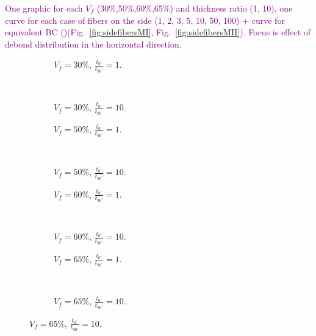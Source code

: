 \documentclass[review]{elsarticle}
\begin{document}
\textcolor{purple}{One graphic for each $V_{f}$ (30\%,50\%,60\%,65\%) and thickness ratio (1, 10), one curve for each case of fibers on the side (1, 2, 3, 5, 10, 50, 100) + curve for equivalent BC ()(Fig.~\ref{fig:sidefibersMI}, Fig.~\ref{fig:sidefibersMII}). Focus is effect of debond distribution in the horizontal direction.}\\

\begin{figure}[!h]
\centering
    \begin{subfigure}[b]{0.45\textwidth}
        \caption{$V_{f}=30\%$, $\frac{t_{0^{\circ}}}{t_{90^{\circ}}}=1$.}\label{subfig:sidefiber30MIthick1}
    \end{subfigure} ~
    \begin{subfigure}[b]{0.45\textwidth}
         \caption{$V_{f}=30\%$, $\frac{t_{0^{\circ}}}{t_{90^{\circ}}}=10$.}\label{subfig:sidefiber30MIthick10}
    \end{subfigure}

   \begin{subfigure}[b]{0.45\textwidth}
        \caption{$V_{f}=50\%$, $\frac{t_{0^{\circ}}}{t_{90^{\circ}}}=1$.}\label{subfig:sidefiber50MIthick1}
    \end{subfigure} ~
    \begin{subfigure}[b]{0.45\textwidth}
         \caption{$V_{f}=50\%$, $\frac{t_{0^{\circ}}}{t_{90^{\circ}}}=10$.}\label{subfig:sidefiber50MIthick10}
    \end{subfigure}

    \begin{subfigure}[b]{0.45\textwidth}
        \caption{$V_{f}=60\%$, $\frac{t_{0^{\circ}}}{t_{90^{\circ}}}=1$.}\label{subfig:sidefiber60MIthick1}
    \end{subfigure} ~
    \begin{subfigure}[b]{0.45\textwidth}
        \caption{$V_{f}=60\%$, $\frac{t_{0^{\circ}}}{t_{90^{\circ}}}=10$.}\label{subfig:sidefiber60MIthick10}
    \end{subfigure}

    \begin{subfigure}[b]{0.45\textwidth}
        \caption{$V_{f}=65\%$, $\frac{t_{0^{\circ}}}{t_{90^{\circ}}}=1$.}\label{subfig:sidefiber65MIthick1}
    \end{subfigure} ~
    \begin{subfigure}[b]{0.45\textwidth}
        \caption{$V_{f}=65\%$, $\frac{t_{0^{\circ}}}{t_{90^{\circ}}}=10$.}\label{subfig:sidefiber65MIthick10}
    \end{subfigure}


\end{figure}
\end{document}
